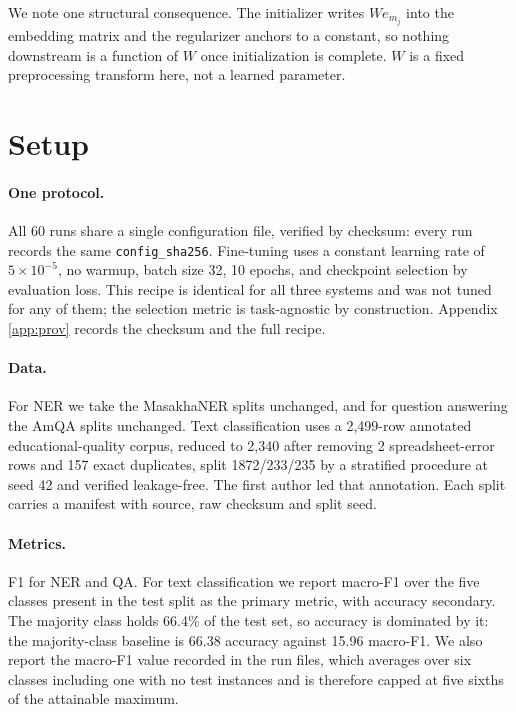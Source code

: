 \documentclass[11pt]{article}
\begin{document}
We note one structural consequence. The initializer writes $We_{m_j}$ into
the embedding matrix and the regularizer anchors to a constant, so nothing
downstream is a function of $W$ once initialization is complete. $W$ is a
fixed preprocessing transform here, not a learned parameter.

\section{Setup}
\label{sec:setup}

\paragraph{One protocol.} All 60 runs share a single configuration file,
verified by checksum: every run records the same \texttt{config\_sha256}.
Fine-tuning uses a constant learning rate of $5\times10^{-5}$, no warmup,
batch size 32, 10 epochs, and checkpoint selection by evaluation loss. This
recipe is identical for all three systems and was not tuned for any of them;
the selection metric is task-agnostic by construction. Appendix
\ref{app:prov} records the checksum and the full recipe.

\paragraph{Data.} For NER we take the MasakhaNER splits
\citep{adelani-etal-2021-masakhaner} unchanged, and for question answering
the AmQA splits \citep{taffa-etal-2024-amqa} unchanged. Text classification
uses a
2{,}499-row annotated educational-quality corpus, reduced to 2{,}340 after
removing 2 spreadsheet-error rows and 157 exact duplicates, split
1872/233/235 by a stratified procedure at seed 42 and verified
leakage-free. The first author led that annotation. Each split carries a
manifest with source, raw checksum and split seed.

\paragraph{Metrics.} F1 for NER and QA. For text classification we report
macro-F1 over the five classes present in the test split as the primary
metric, with accuracy secondary. The majority class holds 66.4\% of the test
set, so accuracy is dominated by it: the majority-class baseline is 66.38
accuracy against 15.96 macro-F1. We also report the macro-F1 value recorded
in the run files, which averages over six classes including one with no test
instances and is therefore capped at five sixths of the attainable maximum.
\end{document}
